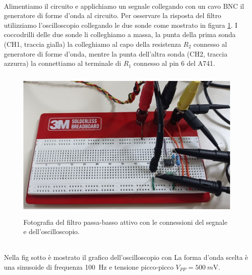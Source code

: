 \documentclass{report}
\begin{document}
\\Alimentiamo il circuito e applichiamo un segnale collegando con un cavo BNC il generatore di forme d'onda al circuito. Per osservare la risposta del filtro utilizziamo l'oscilloscopio collegando le due sonde come mostrato in figura \ref{figura:connessioni}. I coccodrilli delle due sonde li colleghiamo a massa, la punta della prima sonda (CH1, traccia gialla) la colleghiamo al capo della resistenza $R_2$ connesso al generatore di forme d'onda, mentre la punta dell'altra sonda (CH2, traccia azzurra) la connettiamo al terminale di $R_1$ connesso al pin 6 del \textmu A741.
\begin{figure}[h!]
\centering
\includegraphics[height=7.6cm]{immagini/circuito_sonde}
\caption{Fotografia del filtro passa-basso attivo con le connessioni del segnale e dell'oscilloscopio.}
\label{figura:connessioni}
\end{figure}
\\Nella fig sotto è mostrato il grafico dell'oscilloscopio con La forma d'onda scelta è una sinusoide di frequenza \SI{100}{\hertz} e tensione picco-picco $V_{PP}=\SI{500}{m\volt}$. 
\end{document}
